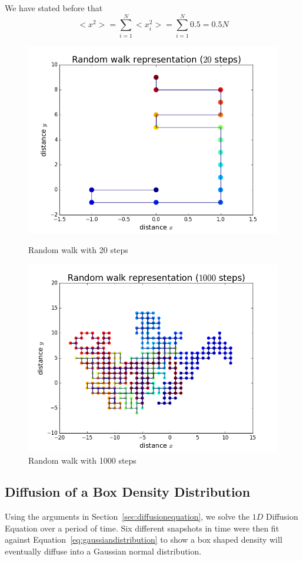 \documentclass[12pt]{article}
\begin{document}
We have stated before that
\begin{equation}
    <x^2>=\sum_{i=1}^N <x_i^2>=\sum_{i=1}^N 0.5=0.5N
\end{equation}

\begin{figure}[!htb]
  \includegraphics[width=\linewidth]{rWalk1.png}
  \caption{Random walk with 20 steps}\label{fig:20steps}
\endminipage\hfill
{}
  \includegraphics[width=\linewidth]{rWalk2.png}
  \caption{Random walk with 1000 steps}\label{fig:1000steps}
\endminipage\hfill
\end{figure}


\subsection{Diffusion of a Box Density Distribution}
\label{sec:diffusion-boxdensity}
Using the arguments in Section~\ref{sec:diffusionequation}, we solve the $1D$ Diffusion Equation over a period of time. Six different snapshots in time were then fit against Equation~\ref{eq:gaussiandistribution} to show a box shaped density will eventually diffuse into a Gaussian normal distribution.
\end{document}
